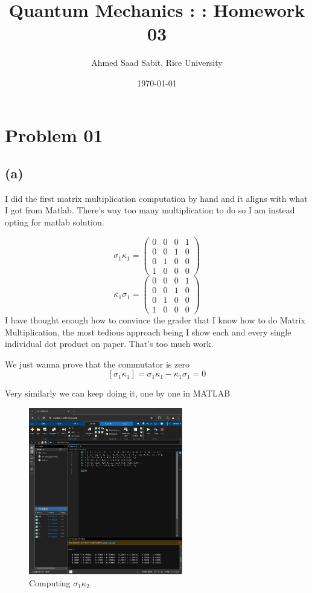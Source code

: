 \documentclass[letter]{article}
\title{Quantum Mechanics : : Homework 03}
\author{Ahmed Saad Sabit, Rice University}
\date{\today}
\begin{document}
\maketitle

\section*{Problem 01} 
\subsection*{(a)}
I did the first matrix multiplication computation by hand and it aligns with what I got from Matlab. There's way too many multiplication to do so I am instead opting for matlab solution. 

\[
\sigma_1 \kappa_1 = 
\begin{pmatrix} 0&0&0&1\\0&0&1&0\\0&1&0&0\\1&0&0&0 \end{pmatrix} 
\] 
\[
\kappa_1 \sigma_1 = \begin{pmatrix} 0&0&0&1\\0&0&1&0\\0&1&0&0\\1&0&0&0 \end{pmatrix} 
\]
I have thought enough how to convince the grader that I know how to do Matrix Multiplication, the most tedious approach being I show each and every single individual dot product on paper. That's too much work. 

We just wanna prove that the commutator is zero
\[
	[ \sigma_1 \kappa_1 ] = 
	\sigma_1 \kappa_1 - \kappa_1 \sigma_1 = 0
\]

Very similarly we can keep doing it, one by one in MATLAB 

\begin{figure}[H]
	\centering
	\includegraphics[width=0.6\textwidth]{ss/matlab01.png}
	\caption{Computing $\sigma_1 \kappa_2$}
	\label{fig:ss-matlab01-png}
\end{figure}
\end{document}

